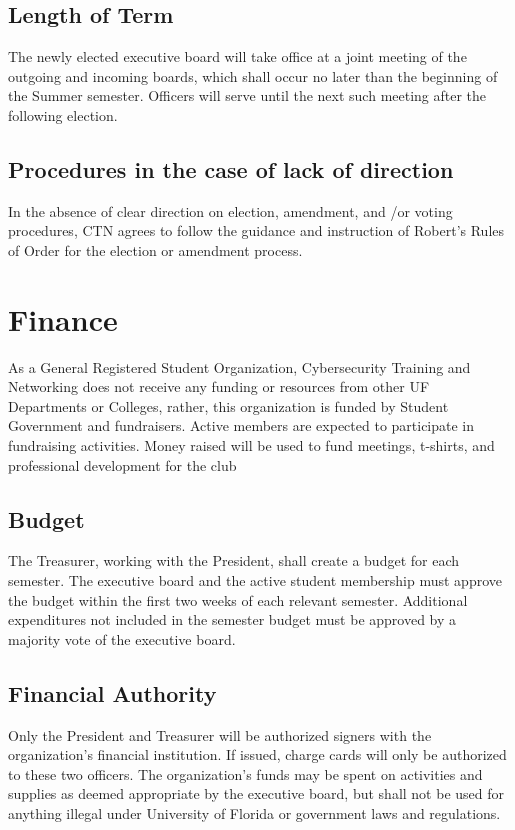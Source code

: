 \documentclass{article}
\def\clubname{CTN }
\def\clubfullname{Cybersecurity Training and Networking }
\begin{document}
\subsection{Length of Term}

The newly elected executive board will take office at a joint meeting of the outgoing and incoming boards, which shall occur no later than the beginning of the Summer semester. Officers will serve until the next such meeting after the following election.


\subsection{Procedures in the case of lack of direction}

In the absence of clear direction on election, amendment, and /or voting procedures, \clubname agrees to follow the guidance and instruction of Robert's Rules of Order for the election or amendment process.


\section{Finance}
As a General Registered Student Organization, \clubfullname does not receive any funding or resources from other UF Departments or Colleges, rather, this organization is funded by Student Government and fundraisers. Active members are expected to participate in fundraising activities. Money raised will be used to fund meetings, t-shirts, and professional development for the club

\subsection{Budget}
The Treasurer, working with the President, shall create a budget for each semester. The executive board and the active student membership must approve the budget within the first two weeks of each relevant semester. Additional expenditures not included in the semester budget must be approved by a majority vote of the executive board.

\subsection{Financial Authority}
Only the President and Treasurer will be authorized signers with the organization’s financial institution. If issued, charge cards will only be authorized to these two officers. The organization’s funds may be spent on activities and supplies as deemed appropriate by the executive board, but shall not be used for anything illegal under University of Florida or government laws and regulations.
\end{document}
